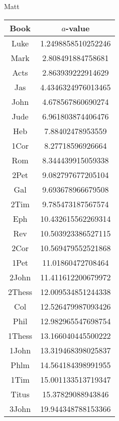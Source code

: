 \documentclass[12pt,letterpaper]{article}
\begin{document}
Matt
\begin{longtable}{|c|c|}
\hline
 Book & $a$-value \\ \hline
Luke & 1.2498858510252246 \\ \hline
 Mark & 2.808491884758681 \\ \hline
 Acts & 2.863939222914629 \\ \hline
 Jas & 4.4346324976013465 \\ \hline
 John & 4.678567860690274 \\ \hline
 Jude & 6.961803874406476 \\ \hline
 Heb & 7.88402478953559 \\ \hline
 1Cor & 8.27718596926664 \\ \hline
 Rom & 8.344439915059338 \\ \hline
 2Pet & 9.082797677205104 \\ \hline
 Gal & 9.693678966679508 \\ \hline
 2Tim & 9.785473187567574 \\ \hline
 Eph & 10.432615562269314 \\ \hline
 Rev & 10.503923386527115 \\ \hline
 2Cor & 10.569479552521868 \\ \hline
 1Pet & 11.01860472708464 \\ \hline
 2John & 11.411612200679972 \\ \hline
 2Thess & 12.009534851244338 \\ \hline
 Col & 12.526479987093426 \\ \hline
 Phil & 12.982965547698754 \\ \hline
 1Thess & 13.166040445500222 \\ \hline
 1John & 13.319468398025837 \\ \hline
 Phlm & 14.564184398991955 \\ \hline
 1Tim & 15.001133513719347 \\ \hline
 Titus & 15.37829088943846 \\ \hline
 3John & 19.944348788153366 \\ \hline 
\end{longtable}
\end{document}
